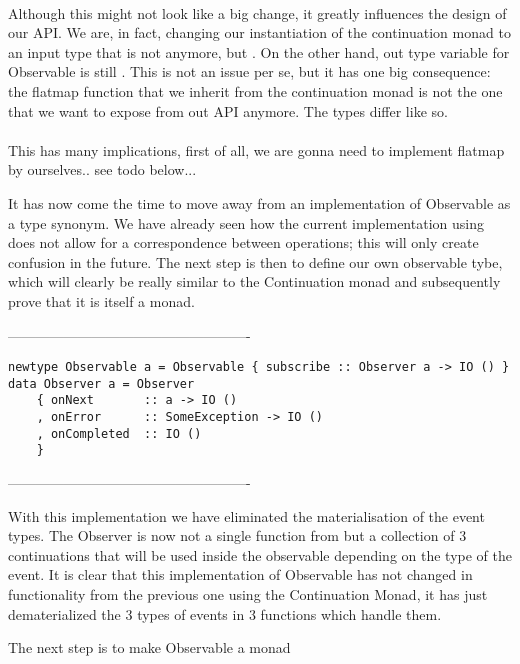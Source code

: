 \\

Although this might not look like a big change, it greatly influences the design of our API. We are, in fact, changing our instantiation of the continuation monad to an input type that is not  anymore, but . On the other hand, out type variable for Observable is still . This is not an issue per se, but it has one big consequence: the flatmap function that we inherit from the continuation monad is not the one that we want to expose from out API anymore. The types differ like so.\\

\\

This has many implications, first of all, we are gonna need to implement flatmap by ourselves.. see todo below...

It has now come the time to move away from an implementation of Observable as a type synonym. We have already seen how the current implementation using  does not allow for a correspondence between \code{>>=} operations; this will only create confusion in the future. The next step is then to define our own observable tybe, which will clearly be really similar to the Continuation monad and subsequently prove that it is itself a monad. 

----------------------------------------------------
\begin{verbatim}
newtype Observable a = Observable { subscribe :: Observer a -> IO () } 
data Observer a = Observer 
    { onNext       :: a -> IO ()
    , onError      :: SomeException -> IO ()
    , onCompleted  :: IO ()
    }
\end{verbatim}
----------------------------------------------------    

With this implementation we have eliminated the materialisation of the event types. The Observer is now not a single function from  but a collection of 3 continuations that will be used inside the observable depending on the type of the event. It is clear that this implementation of Observable has not changed in functionality from the previous one using the Continuation Monad, it has just dematerialized the 3 types of events in 3 functions which handle them.

The next step is to make Observable a monad

